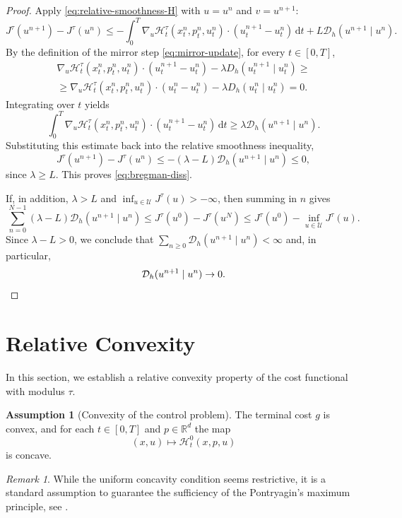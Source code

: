 \documentclass[11pt]{amsart}
\theoremstyle{plain}
\theoremstyle{definition}
\newtheorem{assump}{Assumption}
\theoremstyle{remark}
\newtheorem*{remark}{Remark}
\newcommand{\dd}{\,\mathrm{d}}
\begin{document}
\begin{proof}
Apply \eqref{eq:relative-smoothness-H} with $u=u^n$ and $v=u^{n+1}$: 
\[
J^\tau(u^{n+1})-J^\tau(u^n)
\le
-\int_0^T \nabla_u \mathcal H_t^\tau(x_t^n,p_t^n,u_t^n)\cdot (u_t^{n+1}-u_t^n)\dd t
+
L \mathcal{D}_h(u^{n+1}\mid u^n).
\]
By the definition of the mirror step \eqref{eq:mirror-update}, for every $t\in[0,T]$,
\begin{multline*}
\nabla_u \mathcal H_t^\tau(x_t^n,p_t^n,u_t^n)\cdot (u_t^{n+1}-u_t^n)
- \lambda D_h(u_t^{n+1}\mid u_t^n) \ge \\
\ge
\nabla_u \mathcal H_t^\tau(x_t^n,p_t^n,u_t^n)\cdot (u_t^n-u_t^n)
- \lambda D_h(u_t^n\mid u_t^n)=0.
\end{multline*}
Integrating over $t$ yields
\[
\int_0^T \nabla_u \mathcal H_t^\tau(x_t^n,p_t^n,u_t^n)\cdot (u_t^{n+1}-u_t^n)\dd t
\ge
\lambda \mathcal{D}_h(u^{n+1}\mid u^n).
\]
Substituting this estimate back into the relative smoothness inequality,
\[
J^\tau(u^{n+1})-J^\tau(u^n)
\le
-(\lambda-L)\mathcal{D}_h(u^{n+1}\mid u^n)\le 0,
\]
since $\lambda\ge L$. This proves \eqref{eq:bregman-diss}. 

If, in addition, $\lambda > L$ and $\inf_{u\in\mathcal U}J^\tau(u)>-\infty$, then summing in $n$ gives
\[
\sum_{n=0}^{N-1} (\lambda-L) \mathcal{D}_h(u^{n+1}\mid u^n)
\le
J^\tau(u^0)-J^\tau(u^N)
\le
J^\tau(u^0)-\inf_{u\in\mathcal U}J^\tau(u).
\]
Since $\lambda - L >0$, we conclude that $\sum_{n\ge 0} \mathcal{D}_h(u^{n+1}\mid u^n)<\infty$ and, in particular,
\[
\mathcal{D}_h(u^{n+1}\mid u^n)\to 0. \qedhere
\]
\end{proof}


\section{Relative Convexity}\label{sec:re_convex}

In this section, we establish a relative convexity property of the cost functional with modulus $\tau$.

\begin{assump}[Convexity of the control problem]\label{ass:convexity}
The terminal cost $g$ is convex, and for each $t\in[0,T]$ and $p\in\mathbb R^d$ the map
\[
(x,u)\mapsto \mathcal H_t^0(x,p,u)
\]
is concave.
\end{assump}

\begin{remark}
While the uniform concavity condition seems restrictive, it is a standard assumption to guarantee the sufficiency of the Pontryagin's maximum principle, see \cite[Chapter 3, Theorem 2.5]{yong1999stochastic}. 
\end{remark}
\end{document}
